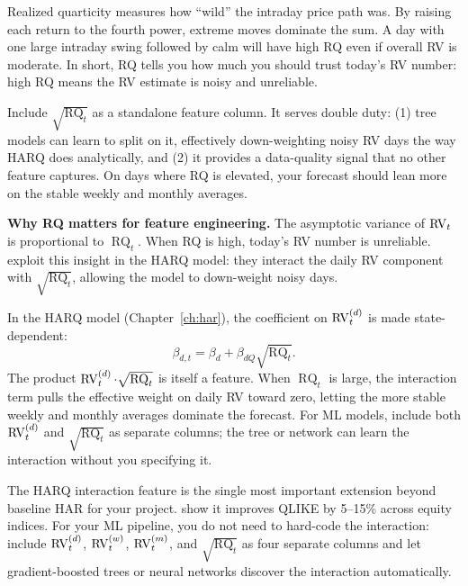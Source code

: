 \begin{intuition}
Realized quarticity measures how ``wild'' the intraday price path was. By raising each return to the fourth power, extreme moves dominate the sum. A day with one large intraday swing followed by calm will have high RQ even if overall RV is moderate. In short, RQ tells you how much you should trust today's RV number: high RQ means the RV estimate is noisy and unreliable.
\end{intuition}

\begin{projectconnection}
Include $\sqrt{\operatorname{RQ}_t}$ as a standalone feature column. It serves double duty: (1) tree models can learn to split on it, effectively down-weighting noisy RV days the way HARQ does analytically, and (2) it provides a data-quality signal that no other feature captures. On days where RQ is elevated, your forecast should lean more on the stable weekly and monthly averages.
\end{projectconnection}

\textbf{Why RQ matters for feature engineering.}
The asymptotic variance of $\operatorname{RV}_t$ is proportional to $\operatorname{RQ}_t$.
When RQ is high, today's RV number is unreliable.
\citet{BollerslevPattonQuaedvlieg2016HARQ} exploit this insight in the HARQ model: they interact the daily RV component with $\sqrt{\operatorname{RQ}_t}$, allowing the model to down-weight noisy days.

\begin{keyidea}
In the HARQ model (Chapter~\ref{ch:har}), the coefficient on $\operatorname{RV}_t^{(d)}$ is made state-dependent:
\[
\beta_{d,t} = \beta_d + \beta_{dQ} \sqrt{\operatorname{RQ}_t}.
\]
The product $\operatorname{RV}_t^{(d)} \cdot \sqrt{\operatorname{RQ}_t}$ is itself a feature.
When $\operatorname{RQ}_t$ is large, the interaction term pulls the effective weight on daily RV toward zero, letting the more stable weekly and monthly averages dominate the forecast.
For ML models, include both $\operatorname{RV}_t^{(d)}$ and $\sqrt{\operatorname{RQ}_t}$ as separate columns; the tree or network can learn the interaction without you specifying it.
\end{keyidea}

\begin{projectconnection}
The HARQ interaction feature is the single most important extension beyond baseline HAR for your project. \citet{BollerslevPattonQuaedvlieg2016HARQ} show it improves QLIKE by 5--15\% across equity indices. For your ML pipeline, you do not need to hard-code the interaction: include $\operatorname{RV}_t^{(d)}$, $\operatorname{RV}_t^{(w)}$, $\operatorname{RV}_t^{(m)}$, and $\sqrt{\operatorname{RQ}_t}$ as four separate columns and let gradient-boosted trees or neural networks discover the interaction automatically.
\end{projectconnection}

